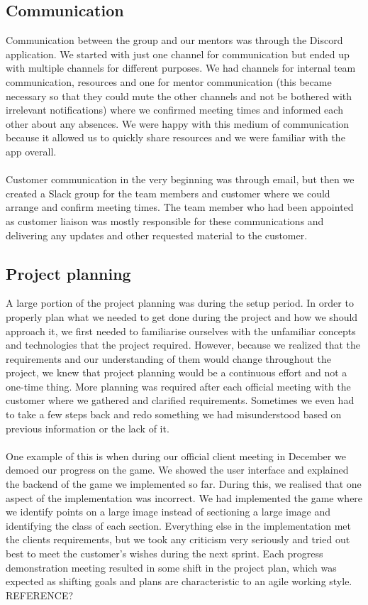 \documentclass{l3proj}
\begin{document}
\subsection*{Communication}
Communication between the group and our mentors was through the Discord application. We started with just one channel for communication but ended up with multiple channels for different purposes. We had channels for internal team communication, resources and one for mentor communication (this became necessary so that they could mute the other channels and not be bothered with irrelevant notifications) where we confirmed meeting times and informed each other about any absences. We were happy with this medium of communication because it allowed us to quickly share resources and we were familiar with the app overall.
\\\\
Customer communication in the very beginning was through email, but then we created a Slack group for the team members and customer where we could arrange and confirm meeting times. The team member who had been appointed as customer liaison was mostly responsible for these communications and delivering any updates and other requested material to the customer.

\subsection*{Project planning}
A large portion of the project planning was during the setup period. In order to properly plan what we needed to get done during the project and how we should approach it, we first needed to familiarise ourselves with the unfamiliar concepts and technologies that the project required. However, because we realized that the requirements and our understanding of them would change throughout the project, we knew that project planning would be a continuous effort and not a one-time thing. More planning was required after each official meeting with the customer where we gathered and clarified requirements. Sometimes we even had to take a few steps back and redo something we had misunderstood based on previous information or the lack of it.
\\\\
One example of this is when during our official client meeting in December we demoed our progress on the game. We showed the user interface and explained the backend of the game we implemented so far.  During this, we realised that one aspect of the implementation was incorrect. We had implemented the game where we identify points on a large image instead of sectioning a large image and identifying the class of each section. Everything else in the implementation met the clients requirements, but we took any criticism very seriously and tried out best to meet the customer's wishes during the next sprint. Each progress demonstration meeting resulted in some shift in the project plan, which was expected as shifting goals and plans are characteristic to an agile working style. REFERENCE?
\end{document}
